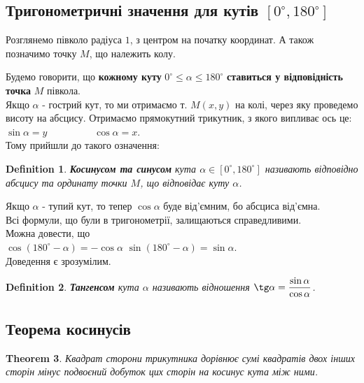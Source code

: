 \documentclass[a4paper, 10pt]{article}
\theoremstyle{theoremdd}
\newtheorem{theorem}{Theorem}[subsection]
\theoremstyle{theoremdd}
\theoremstyle{theoremdd}
\newtheorem{definition}[theorem]{Definition}
\theoremstyle{theoremdd}
\theoremstyle{theoremdd}
\theoremstyle{theoremdd}
\theoremstyle{theoremdd}
\theoremstyle{theoremdd}
\theoremstyle{theoremdd}
\begin{document}
\subsection{Тригонометричні значення для кутів $[0^\circ,180^\circ]$}
Розглянемо півколо радіуса $1$, з центром на початку координат. А також позначимо точку $M$, що належить колу.
\begin{figure}[H]
\centering
{}
\end{figure}
Будемо говорити, що \textbf{кожному куту} $0^{\circ} \leq \alpha \leq 180^\circ$ \textbf{ставиться у відповідність точка} $M$ півкола.\\
Якщо $\alpha$ - гострий кут, то ми отримаємо т. $M(x,y)$ на колі, через яку проведемо висоту на абсцису. Отримаємо прямокутний трикутник, з якого випливає ось це:\\
$\sin \alpha = y \hspace{2cm} \cos \alpha = x$.\\
Тому прийшли до такого означення:
\begin{definition}
\textbf{Косинусом та синусом} кута $\alpha \in [0^\circ,180^\circ]$ називають відповідно абсцису та ординату точки $M$, що відповідає куту $\alpha$.
\end{definition}
Якщо $\alpha$ - тупий кут, то тепер $\cos \alpha$ буде від'ємним, бо абсциса від'ємна.
\bigskip \\
Всі формули, що були в тригонометрії, залищаються справедливими.
\bigskip \\
Можна довести, що \\
$\cos (180^\circ-\alpha) = -\cos \alpha$ \hspace{1cm} $\sin (180^\circ - \alpha) = \sin \alpha$.\\
Доведення є зрозумілим.

\begin{definition}
\textbf{Тангенсом} кута $\alpha$ називають відношення $\tg \alpha = \dfrac{\sin \alpha}{\cos \alpha}$.
\end{definition}

\subsection{Теорема косинусів}
\begin{theorem}
Квадрат сторони трикутника дорівнює сумі квадратів двох інших сторін мінус подвоєний добуток цих сторін на косинус кута між ними.
\end{theorem}
\end{document}
